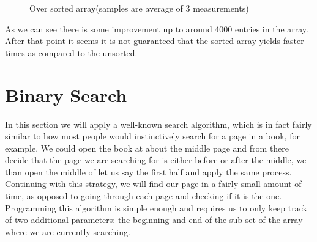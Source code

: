 \documentclass[a4paper,11pt]{article}
\begin{document}
\begin{figure}[H]
    \centering
    \caption{Over sorted array(samples are average of 3 measurements)}
    \label{fig:plot2}
\end{figure}

As we can see there is some improvement up to around 4000 entries in the array. After that point it seems it is not guaranteed that the sorted array yields faster times as compared to the unsorted.

\section*{Binary Search}

In this section we will apply a well-known search algorithm, which is in fact fairly similar to how most people would instinctively search for a page in a book, for example. We could open the book at about the middle page and from there decide that the page we are searching for is either before or after the middle, we than open the middle of let us say the first half and apply the same process. Continuing with this strategy, we will find our page in a fairly small amount of time, as opposed to going through each page and checking if it is the one. Programming this algorithm is simple enough and requires us to only keep track of two additional parameters: the beginning and end of the sub set of the array where we are currently searching. 
\end{document}
